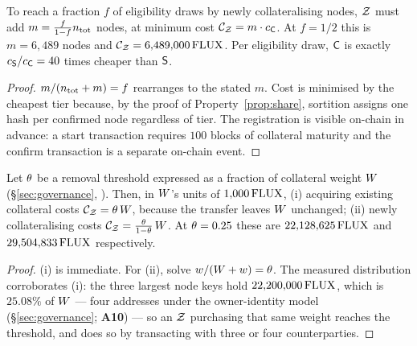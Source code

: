 \begin{property}
\label{prop:eligibility-cost}
\shipped To reach a fraction $f$ of eligibility draws by newly collateralising nodes,
$\mathcal{Z}$ must add $m = \frac{f}{1-f}n_{\mathrm{tot}}$ nodes, at minimum cost
$\mathcal{C}_{\mathcal{Z}} = m\cdot c_{\mathsf{C}}$. At $f = 1/2$ this is $m = 6{,}489$ nodes and
$\mathcal{C}_{\mathcal{Z}} = 6{,}489{,}000\,\mathrm{FLUX}$. Per eligibility draw, $\mathsf{C}$ is exactly
$c_{\mathsf{S}}/c_{\mathsf{C}} = 40$ times cheaper than $\mathsf{S}$.
\end{property}

\begin{proof}
$m/(n_{\mathrm{tot}}+m) = f$ rearranges to the stated $m$. Cost is minimised by the cheapest
tier because, by the proof of Property~\ref{prop:share}, sortition assigns one hash per confirmed
node regardless of tier. The registration is visible on-chain in advance: a start transaction
requires $100$ blocks of collateral maturity  and the
confirm transaction is a separate on-chain event.
\end{proof}

\begin{property}
\label{prop:moderation-cost}
Let $\theta$ be a removal threshold expressed as a fraction of collateral weight $W$
(\S\ref{sec:governance}, \planned). Then, in $W$'s units of $1{,}000\,\mathrm{FLUX}$,
(i) acquiring existing collateral costs $\mathcal{C}_{\mathcal{Z}} = \theta\,W$, because the transfer leaves
$W$ unchanged; (ii) newly collateralising costs
$\mathcal{C}_{\mathcal{Z}} = \frac{\theta}{1-\theta}\,W$. At $\theta = 0.25$ these are
$22{,}128{,}625\,\mathrm{FLUX}$ and $29{,}504{,}833\,\mathrm{FLUX}$ respectively.
\end{property}

\begin{proof}
(i) is immediate. For (ii), solve $w/(W+w) = \theta$. The measured distribution corroborates
(i): the three largest node keys hold $22{,}200{,}000\,\mathrm{FLUX}$, which is $25.08\%$ of $W$
 --- four addresses under the
owner-identity model (\S\ref{sec:governance}; \textbf{A10}) --- so an $\mathcal{Z}$ purchasing that same
weight reaches the threshold, and does so by transacting with three or four counterparties.
\end{proof}

